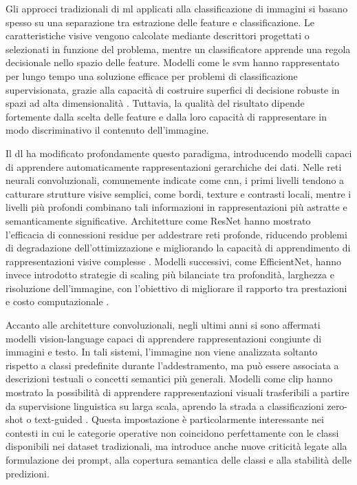 Gli approcci tradizionali di \gls{ml} applicati alla classificazione di immagini si basano spesso su una separazione tra estrazione delle feature e classificazione. Le caratteristiche visive vengono calcolate mediante descrittori progettati o selezionati in funzione del problema, mentre un classificatore apprende una regola decisionale nello spazio delle feature. Modelli come le \gls{svm} hanno rappresentato per lungo tempo una soluzione efficace per problemi di classificazione supervisionata, grazie alla capacità di costruire superfici di decisione robuste in spazi ad alta dimensionalità \cite{cortes1995support,bishop2006pattern}. Tuttavia, la qualità del risultato dipende fortemente dalla scelta delle feature e dalla loro capacità di rappresentare in modo discriminativo il contenuto dell'immagine.

Il \gls{dl} ha modificato profondamente questo paradigma, introducendo modelli capaci di apprendere automaticamente rappresentazioni gerarchiche dei dati. Nelle reti neurali convoluzionali, comunemente indicate come \gls{cnn}, i primi livelli tendono a catturare strutture visive semplici, come bordi, texture e contrasti locali, mentre i livelli più profondi combinano tali informazioni in rappresentazioni più astratte e semanticamente significative. Architetture come ResNet hanno mostrato l'efficacia di connessioni residue per addestrare reti profonde, riducendo problemi di degradazione dell'ottimizzazione e migliorando la capacità di apprendimento di rappresentazioni visive complesse \cite{he2016deep}. Modelli successivi, come EfficientNet, hanno invece introdotto strategie di scaling più bilanciate tra profondità, larghezza e risoluzione dell'immagine, con l'obiettivo di migliorare il rapporto tra prestazioni e costo computazionale \cite{tan2019efficientnet}.

Accanto alle architetture convoluzionali, negli ultimi anni si sono affermati modelli vision-language capaci di apprendere rappresentazioni congiunte di immagini e testo. In tali sistemi, l'immagine non viene analizzata soltanto rispetto a classi predefinite durante l'addestramento, ma può essere associata a descrizioni testuali o concetti semantici più generali. Modelli come \gls{clip} hanno mostrato la possibilità di apprendere rappresentazioni visuali trasferibili a partire da supervisione linguistica su larga scala, aprendo la strada a classificazioni zero-shot o text-guided \cite{radford2021learning}. Questa impostazione è particolarmente interessante nei contesti in cui le categorie operative non coincidono perfettamente con le classi disponibili nei dataset tradizionali, ma introduce anche nuove criticità legate alla formulazione dei prompt, alla copertura semantica delle classi e alla stabilità delle predizioni.

